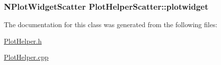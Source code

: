 \hypertarget{class_plot_helper_scatter_c2f3acc7acfa54393536534f108a97a8}{
\subsubsection[{plotwidget}]{\setlength{\rightskip}{0pt plus 5cm}NPlotWidgetScatter {\bf PlotHelperScatter::plotwidget}}}
\label{class_plot_helper_scatter_c2f3acc7acfa54393536534f108a97a8}




The documentation for this class was generated from the following files:\begin{CompactItemize}
\item 
\hyperlink{_plot_helper_8h}{PlotHelper.h}\item 
\hyperlink{_plot_helper_8cpp}{PlotHelper.cpp}\end{CompactItemize}

